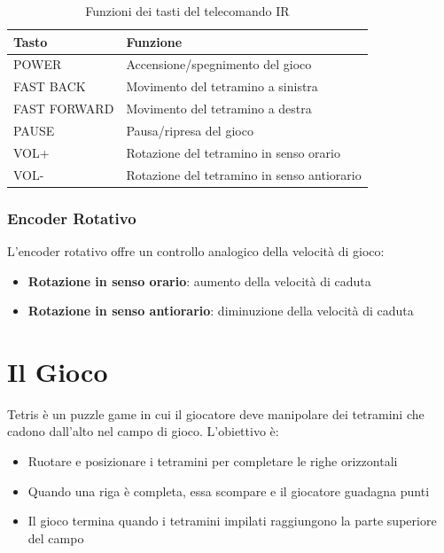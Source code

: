 \documentclass[a4paper, 12pt]{article}
\begin{document}
\begin{table}[H]
    \centering
    \caption{Funzioni dei tasti del telecomando IR}
    \label{tab:ir-functions}
    \begin{tabular}{ll}
        \toprule
        \textbf{Tasto} & \textbf{Funzione}                           \\
        \midrule
        POWER          & Accensione/spegnimento del gioco            \\
        FAST BACK      & Movimento del tetramino a sinistra          \\
        FAST FORWARD   & Movimento del tetramino a destra            \\
        PAUSE          & Pausa/ripresa del gioco                     \\
        VOL+           & Rotazione del tetramino in senso orario     \\
        VOL-           & Rotazione del tetramino in senso antiorario \\
        \bottomrule
    \end{tabular}
\end{table}

\subsubsection{Encoder Rotativo}
\label{subsubsec:encoder}
L'encoder rotativo offre un controllo analogico della velocità di gioco:
\begin{itemize}
    \item \textbf{Rotazione in senso orario}: aumento della velocità di caduta
    \item \textbf{Rotazione in senso antiorario}: diminuzione della velocità di caduta
\end{itemize}

\section{Il Gioco}
\label{sec:gioco}
Tetris è un puzzle game in cui il giocatore deve manipolare dei tetramini che cadono dall'alto nel campo di gioco. L'obiettivo è:
\begin{itemize}
    \item Ruotare e posizionare i tetramini per completare le righe orizzontali
    \item Quando una riga è completa, essa scompare e il giocatore guadagna punti
    \item Il gioco termina quando i tetramini impilati raggiungono la parte superiore del campo
\end{itemize}
\end{document}
